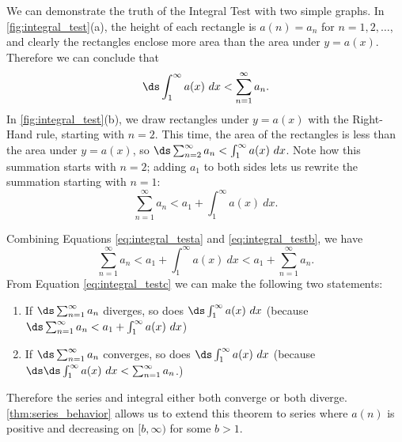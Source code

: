 We can demonstrate the truth of the Integral Test with two simple graphs. In \autoref{fig:integral_test}(a), the height of each rectangle is $a(n)=a_n$ for $n=1,2,\ldots$, and clearly the rectangles enclose more area than the area under $y=a(x)$. Therefore we can conclude that \
\begin{equation}
\ds \int_1^\infty a(x)\ dx < \sum_{n=1}^\infty a_n.
\label{eq:integral_testa}
\end{equation}
In \autoref{fig:integral_test}(b), we draw rectangles under $y=a(x)$ with the Right-Hand rule, starting with $n=2$. This time, the area of the rectangles is less than the area under $y=a(x)$, so $\ds\sum_{n=2}^\infty a_n < \int_1^\infty a(x)\ dx$. Note how this summation starts with $n=2$; adding $a_1$ to both sides lets us rewrite the summation starting with $n=1$:
\begin{equation}\sum_{n=1}^\infty a_n < a_1 +\int_1^\infty a(x)\ dx.\label{eq:integral_testb}
\end{equation} 


Combining Equations \eqref{eq:integral_testa} and \eqref{eq:integral_testb}, we have
\begin{equation}\sum_{n=1}^\infty a_n< a_1 +\int_1^\infty a(x)\ dx < a_1 + \sum_{n=1}^\infty a_n.\label{eq:integral_testc}\end{equation}
From Equation \eqref{eq:integral_testc} we can make the following two statements:
\begin{enumerate}
	\item If $\ds \sum_{n=1}^\infty a_n$ diverges, so does $\ds\int_1^\infty a(x)\ dx$ \quad (because $\ds \sum_{n=1}^\infty a_n < a_1 +\int_1^\infty a(x)\ dx$)
	\item	If $\ds \sum_{n=1}^\infty a_n$ converges, so does $\ds\int_1^\infty a(x)\ dx$ \quad (because $\ds \ds \int_1^\infty a(x)\ dx < \sum_{n=1}^\infty a_n$.)
\end{enumerate}
Therefore the series and integral either both converge or both diverge. \autoref{thm:series_behavior} allows us to extend this theorem to series where $a(n)$ is positive and decreasing on $[b,\infty)$ for some $b>1$.\\

